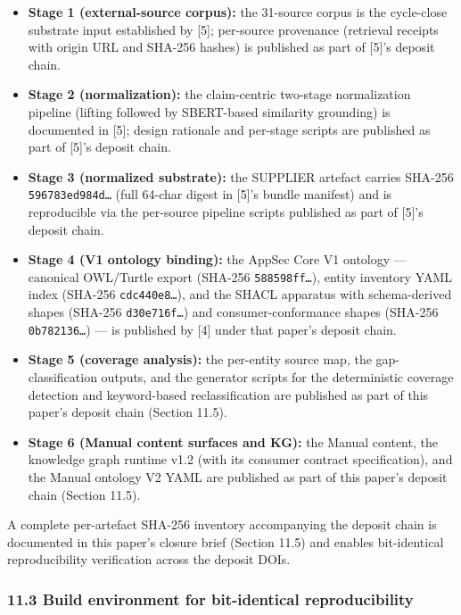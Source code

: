 \documentclass[
]{article}
\providecommand{\tightlist}{%
  \setlength{\itemsep}{0pt}\setlength{\parskip}{0pt}}
\begin{document}
\begin{itemize}
\tightlist
\item
  \textbf{Stage 1 (external-source corpus):} the 31-source corpus is the
  cycle-close substrate input established by {[}5{]}; per-source
  provenance (retrieval receipts with origin URL and SHA-256 hashes) is
  published as part of {[}5{]}'s deposit chain.
\item
  \textbf{Stage 2 (normalization):} the claim-centric two-stage
  normalization pipeline (lifting followed by SBERT-based similarity
  grounding) is documented in {[}5{]}; design rationale and per-stage
  scripts are published as part of {[}5{]}'s deposit chain.
\item
  \textbf{Stage 3 (normalized substrate):} the SUPPLIER artefact carries
  SHA-256 \texttt{596783ed984d…} (full 64-char digest in {[}5{]}'s
  bundle manifest) and is reproducible via the per-source pipeline
  scripts published as part of {[}5{]}'s deposit chain.
\item
  \textbf{Stage 4 (V1 ontology binding):} the AppSec Core V1 ontology
  --- canonical OWL/Turtle export (SHA-256 \texttt{588598ff…}), entity
  inventory YAML index (SHA-256 \texttt{cdc440e8…}), and the SHACL
  apparatus with schema-derived shapes (SHA-256 \texttt{d30e716f…}) and
  consumer-conformance shapes (SHA-256 \texttt{0b782136…}) --- is
  published by {[}4{]} under that paper's deposit chain.
\item
  \textbf{Stage 5 (coverage analysis):} the per-entity source map, the
  gap-classification outputs, and the generator scripts for the
  deterministic coverage detection and keyword-based reclassification
  are published as part of this paper's deposit chain (Section 11.5).
\item
  \textbf{Stage 6 (Manual content surfaces and KG):} the Manual content,
  the knowledge graph runtime v1.2 (with its consumer contract
  specification), and the Manual ontology V2 YAML are published as part
  of this paper's deposit chain (Section 11.5).
\end{itemize}

A complete per-artefact SHA-256 inventory accompanying the deposit chain
is documented in this paper's closure brief (Section 11.5) and enables
bit-identical reproducibility verification across the deposit DOIs.

\subsubsection{11.3 Build environment for bit-identical
reproducibility}\label{build-environment-for-bit-identical-reproducibility}
\end{document}
